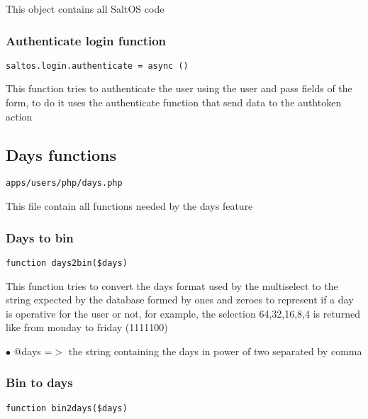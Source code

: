 \documentclass[a4paper]{article}
\begin{document}
This object contains all SaltOS code

\hypertarget{toc159}{}
\subsubsection{Authenticate login function}

\begin{lstlisting}
saltos.login.authenticate = async ()
\end{lstlisting}

This function tries to authenticate the user using the user and pass fields of the form, to do
it uses the authenticate function that send data to the authtoken action

\hypertarget{toc160}{}
\subsection{Days functions}

\begin{lstlisting}
apps/users/php/days.php
\end{lstlisting}

This file contain all functions needed by the days feature

\hypertarget{toc161}{}
\subsubsection{Days to bin}

\begin{lstlisting}
function days2bin($days)
\end{lstlisting}

This function tries to convert the days format used by the multiselect
to the string expected by the database formed by ones and zeroes to
represent if a day is operative for the user or not, for example, the
selection 64,32,16,8,4 is returned like from monday to friday (1111100)

\begin{compactitem}
\item[\color{myblue}$\bullet$] @days =$>$ the string containing the days in power of two separated by comma
\end{compactitem}

\hypertarget{toc162}{}
\subsubsection{Bin to days}

\begin{lstlisting}
function bin2days($days)
\end{lstlisting}
\end{document}
